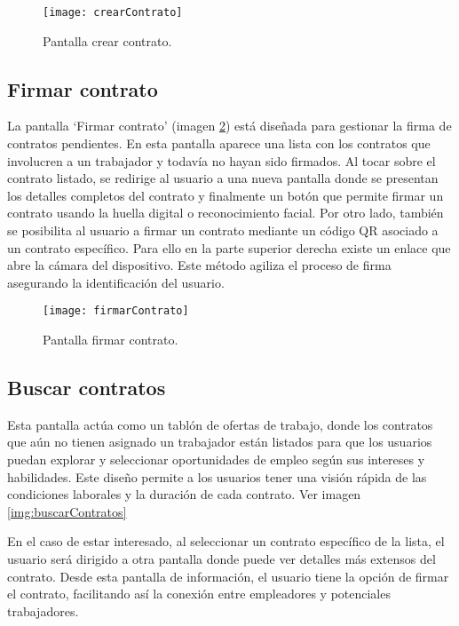 \begin{figure}[h]
	\label{img:crearContrato}
	\centering
	\texttt{[image: crearContrato]}
	\caption[Pantalla crear contrato]{Pantalla crear contrato.}
\end{figure}


\subsection{Firmar contrato}

La pantalla `Firmar contrato' (imagen \ref{img:firmarContrato}) está diseñada para gestionar la firma de contratos pendientes.
En esta pantalla aparece una lista con los contratos que involucren a un trabajador y todavía no hayan sido firmados.
Al tocar sobre el contrato listado, se redirige al usuario a una nueva pantalla donde se presentan los detalles completos del contrato y finalmente un botón que permite firmar un contrato usando la huella digital o reconocimiento facial.
Por otro lado, también se posibilita al usuario a firmar un contrato mediante un código QR asociado a un contrato específico. Para ello en la parte superior derecha existe un enlace que abre la cámara del dispositivo.
Este método agiliza el proceso de firma asegurando la identificación del usuario.

\begin{figure}[h]
	\label{img:firmarContrato}
	\centering
	\texttt{[image: firmarContrato]}
	\caption[Pantalla firmar contrato]{Pantalla firmar contrato.}
\end{figure}


\subsection{Buscar contratos}

Esta pantalla actúa como un tablón de ofertas de trabajo, donde los contratos que aún no tienen asignado un trabajador están listados para que los usuarios puedan explorar y seleccionar oportunidades de empleo según sus intereses y habilidades. 
Este diseño permite a los usuarios tener una visión rápida de las condiciones laborales y la duración de cada contrato. Ver imagen \ref{img:buscarContratos}

En el caso de estar interesado, al seleccionar un contrato específico de la lista, el usuario será dirigido a otra pantalla donde puede ver detalles más extensos del contrato. Desde esta pantalla de información, el usuario tiene la opción de firmar el contrato, facilitando así la conexión entre empleadores y potenciales trabajadores.

